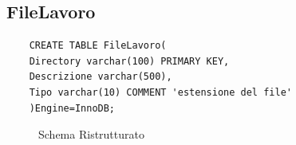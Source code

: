 \documentclass{elegantbook}
\begin{document}
\subsection{FileLavoro}
\begin{verbatim}
	CREATE TABLE FileLavoro(
	Directory varchar(100) PRIMARY KEY,
	Descrizione varchar(500),
	Tipo varchar(10) COMMENT 'estensione del file'
	)Engine=InnoDB;
\end{verbatim}
\begin{figure}[H]
	\centering
	\caption{Schema Ristrutturato}
\end{figure}
\end{document}
